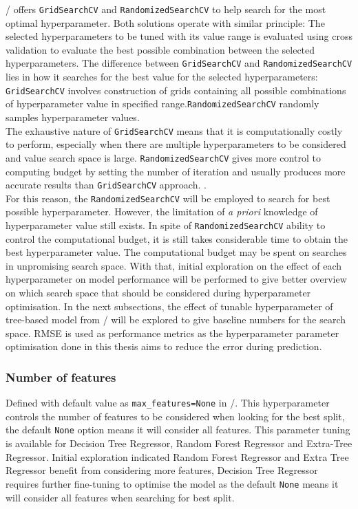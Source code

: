 \scikit/ offers {\tt GridSearchCV} and {\tt RandomizedSearchCV} to help search for the most optimal hyperparameter. Both solutions operate with similar principle: The selected hyperparameters to be tuned with its value range is evaluated using cross validation to evaluate the best possible combination between the selected hyperparameters. The difference between {\tt GridSearchCV} and {\tt RandomizedSearchCV} lies in how it searches for the best value for the selected hyperparameters: {\tt GridSearchCV} involves construction of grids containing all possible combinations of hyperparameter value in specified range.{\tt RandomizedSearchCV} randomly samples hyperparameter values.\\ 

The exhaustive nature of {\tt GridSearchCV} means that it is computationally costly to perform, especially when there are multiple hyperparameters to be considered and value search space is large. {\tt RandomizedSearchCV} gives more control to computing budget by setting the number of iteration and usually produces more accurate results than {\tt GridSearchCV} approach. \cite{Geron.2019,J.Bergstra.2012}. \\

For this reason, the {\tt RandomizedSearchCV} will be employed to search for best possible hyperparameter. However, the limitation of \emph{a priori} knowledge of hyperparameter value still exists. In spite of {\tt RandomizedSearchCV} ability to control the computational budget, it is still takes considerable time to obtain the best hyperparameter value. The computational budget may be spent on searches in unpromising search space. With that, initial exploration on the effect of each hyperparameter on model performance will be performed to give better overview on which search space that should be considered during hyperparameter optimisation. In the next subsections, the effect of tunable hyperparameter of tree-based model from \scikit/ will be explored to give baseline numbers for the search space. RMSE is used as performance metrics as the hyperparameter parameter optimisation done in this thesis aims to reduce the error during prediction. \\ 

\subsubsection{Number of features}\label{sec:max_features}

Defined with default value as {\tt max\_features=None} in \scikit/. This hyperparameter controls the number of features to be considered when looking for the best split, the default {\tt None} option means it will consider all features. This parameter tuning is available for Decision Tree Regressor, Random Forest Regressor and Extra-Tree Regressor. Initial exploration indicated Random Forest Regressor and Extra Tree Regressor benefit from considering more features, Decision Tree Regressor requires further fine-tuning to optimise the model as the default {\tt None} means it will consider all features when searching for best split.\\ 

